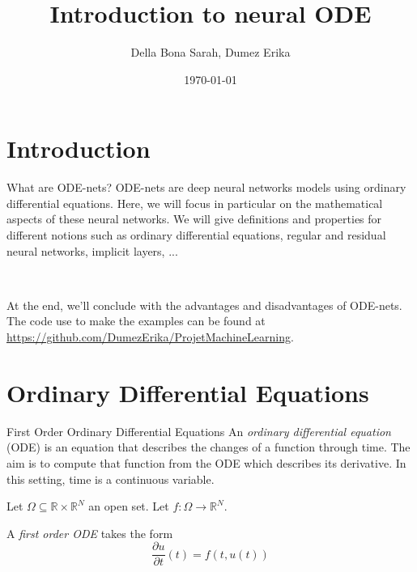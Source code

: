 \documentclass[11pt]{beamer}
\title{Introduction to neural ODE}
\author{Della Bona Sarah, Dumez Erika}
\date{\today}
\begin{document}
\AtBeginSubsection[]{
\begin{frame}
\tableofcontents[ 
    currentsubsection, 
    hideothersubsections, 
    sectionstyle=show/shaded, 
    subsectionstyle=show/hide
    ]

\end{frame}}



\begin{frame}
\titlepage
\end{frame}

\begin{frame}
\tableofcontents[hidesubsections]
\end{frame}

\section{Introduction}
\begin{frame}{What are ODE-nets?}
ODE-nets are deep neural networks models using ordinary differential equations. Here, we will focus in particular on the mathematical aspects of these neural networks. We will give definitions and properties for different notions such as ordinary differential equations, regular and residual neural networks, implicit layers, ... 

~

At the end, we'll conclude with the advantages and disadvantages of ODE-nets.
The code use to make the examples can be found at \url{https://github.com/DumezErika/ProjetMachineLearning}.
\end{frame}

\section{Ordinary Differential Equations}
\begin{frame}{First Order Ordinary Differential Equations}
An\textit{ ordinary differential equation} (ODE) \cite{9} is an equation that describes the changes of a function through time. The aim is to compute that function from the ODE which describes its derivative. In this setting, time is a continuous variable.

\begin{definition}
Let $\Omega \subseteq \mathbb{R} \times \mathbb{R}^N$ an open set. Let $f: \Omega \rightarrow \mathbb{R}^N$. 

A \textit{first order ODE} takes the form
$$
\frac{\partial u}{\partial t}(t) = f(t,u(t))
$$
\end{definition}
\end{frame}
\end{document}
